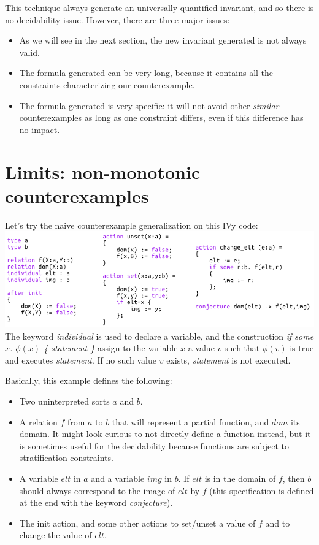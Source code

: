 \documentclass[11pt,a4paper,oldfontcommands]{memoir}
\begin{document}
    This technique always generate an universally-quantified invariant, and so there is no decidability issue.
    However, there are three major issues:
    \begin{itemize}
        \item As we will see in the next section, the new invariant generated is not always valid.
        \item The formula generated can be very long, because it contains all the constraints characterizing our counterexample.
        \item The formula generated is very specific: it will not avoid other \textit{similar} counterexamples as long as
        one constraint differs, even if this difference has no impact.
    \end{itemize}

    \section{Limits: non-monotonic counterexamples}

    Let's try the naive counterexample generalization on this IVy code:\\

    \includegraphics[width=15cm]{NonMonotonicExLarge}
    \\
    The keyword \textit{individual} is used to declare a variable, and the construction \textit{if some \(x\). \(\phi(x)\) \{ statement \}}
    assign to the variable \(x\) a value \(v\) such that \(\phi(v)\) is true and executes \textit{statement}. If no such value \(v\) exists,
    \textit{statement} is not executed.

    Basically, this example defines the following:
    \begin{itemize}
        \item Two uninterpreted sorts \(a\) and \(b\).
        \item A relation \(f\) from \(a\) to \(b\) that will represent a partial function, and \(dom\) its domain. It might look curious to not directly define a function instead,
        but it is sometimes useful for the decidability because functions are subject to stratification constraints.
        \item A variable \(elt\) in \(a\) and a variable \(img\) in \(b\). If \(elt\) is in the domain of \(f\), then \(b\) should always
        correspond to the image of \(elt\) by \(f\) (this specification is defined at the end with the keyword \textit{conjecture}).
        \item The init action, and some other actions to set/unset a value of \(f\) and to change the value of \(elt\).
    \end{itemize}
\end{document}
